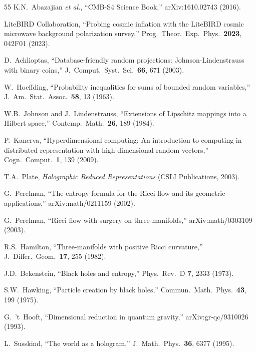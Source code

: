 \documentclass[aps,prd,preprint,superscriptaddress,showpacs,nofootinbib,longbibliography]{revtex4-2}
\begin{document}
\begin{thebibliography}{55}
K.N.~Abazajian \textit{et al.},
``CMB-S4 Science Book,''
arXiv:1610.02743 (2016).

LiteBIRD Collaboration,
``Probing cosmic inflation with the LiteBIRD cosmic microwave background polarization survey,''
Prog.\ Theor.\ Exp.\ Phys.\ \textbf{2023}, 042F01 (2023).


D.~Achlioptas,
``Database-friendly random projections: Johnson-Lindenstrauss with binary coins,''
J.\ Comput.\ Syst.\ Sci.\ \textbf{66}, 671 (2003).

W.~Hoeffding,
``Probability inequalities for sums of bounded random variables,''
J.\ Am.\ Stat.\ Assoc.\ \textbf{58}, 13 (1963).

W.B.~Johnson and J.~Lindenstrauss,
``Extensions of Lipschitz mappings into a Hilbert space,''
Contemp.\ Math.\ \textbf{26}, 189 (1984).

P.~Kanerva,
``Hyperdimensional computing: An introduction to computing in distributed representation with high-dimensional random vectors,''
Cogn.\ Comput.\ \textbf{1}, 139 (2009).

T.A.~Plate,
\textit{Holographic Reduced Representations} (CSLI Publications, 2003).

G.~Perelman,
``The entropy formula for the Ricci flow and its geometric applications,''
arXiv:math/0211159 (2002).

G.~Perelman,
``Ricci flow with surgery on three-manifolds,''
arXiv:math/0303109 (2003).

R.S.~Hamilton,
``Three-manifolds with positive Ricci curvature,''
J.\ Differ.\ Geom.\ \textbf{17}, 255 (1982).

J.D.~Bekenstein,
``Black holes and entropy,''
Phys.\ Rev.\ D \textbf{7}, 2333 (1973).

S.W.~Hawking,
``Particle creation by black holes,''
Commun.\ Math.\ Phys.\ \textbf{43}, 199 (1975).

G.~'t~Hooft,
``Dimensional reduction in quantum gravity,''
arXiv:gr-qc/9310026 (1993).

L.~Susskind,
``The world as a hologram,''
J.\ Math.\ Phys.\ \textbf{36}, 6377 (1995).


\end{thebibliography}
\end{document}
